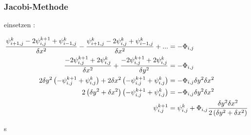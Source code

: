 \begin{frame}
\frametitle{Jacobi-Methode}
einsetzen :
\begin{tiny}
\begin{align}
    	\frac{\psi^{k}_{i+1,j} - 2 \psi^{k+1}_{i,j} + \psi^{k}_{i-1,j}}{\delta x^2}
-
	\frac{\psi^{k}_{i+1,j} - 2 \psi^{k  }_{i,j} + \psi^{k}_{i-1,j}}{\delta x^2}
+ 
	...
    &=
    -\Phi_{i,j} 	\nonumber \\
   \frac{ - 2 \psi^{k+1}_{i,j} 
    + 2 \psi^{k  }_{i,j} }{\delta x^2}
+ 
	\frac{- 2 \psi^{k+1}_{i,j} 
	+ 2 \psi^{k  }_{i,j} }{\delta y^2}
    &=
    -\Phi_{i,j} 	\nonumber \\
     2 \delta y^2 \left( -\psi^{k+1}_{i,j} +  \psi^{k  }_{i,j} \right)
+ 
	  2 \delta x^2 \left(- \psi^{k+1}_{i,j} +  \psi^{k  }_{i,j} \right)
    &=
    -\Phi_{i,j} \delta y^2	\delta x^2\nonumber \\ 
     2 \left( \delta y^2 + \delta x^2 \right)
        \left(  -\psi^{k+1}_{i,j} +  \psi^{k  }_{i,j}  \right)    
    &=
    -\Phi_{i,j} \delta y^2	\delta x^2\nonumber \\      
    \psi^{k+1}_{i,j}     
    &=
    \psi^{k  }_{i,j}   +    \Phi_{i,j} \frac{ \delta y^2	\delta x^2  }{2\left( \delta y^2 + \delta x^2 \right)}  \nonumber 
\end{align}
\end{tiny}
\end{frame}

s
